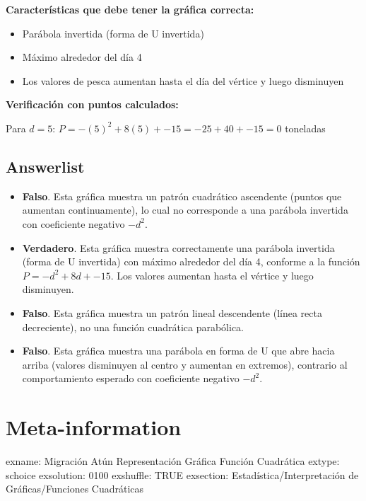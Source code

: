 \documentclass[
]{article}
\providecommand{\tightlist}{%
  \setlength{\itemsep}{0pt}\setlength{\parskip}{0pt}}
\begin{document}
\textbf{Características que debe tener la gráfica correcta:}

\begin{itemize}
\tightlist
\item
  Parábola invertida (forma de U invertida)
\item
  Máximo alrededor del día 4
\item
  Los valores de pesca aumentan hasta el día del vértice y luego
  disminuyen
\end{itemize}

\textbf{Verificación con puntos calculados:}

Para \(d = 5\): \(P = -(5)^2 + 8(5) + -15 = -25 + 40 + -15 = 0\)
toneladas

\subsection{Answerlist}\label{answerlist-1}

\begin{itemize}
\tightlist
\item
  \textbf{Falso}. Esta gráfica muestra un patrón cuadrático ascendente
  (puntos que aumentan continuamente), lo cual no corresponde a una
  parábola invertida con coeficiente negativo \(-d^2\).
\item
  \textbf{Verdadero}. Esta gráfica muestra correctamente una parábola
  invertida (forma de U invertida) con máximo alrededor del día 4,
  conforme a la función \(P = -d^2 + 8d + -15\). Los valores aumentan
  hasta el vértice y luego disminuyen.
\item
  \textbf{Falso}. Esta gráfica muestra un patrón lineal descendente
  (línea recta decreciente), no una función cuadrática parabólica.
\item
  \textbf{Falso}. Esta gráfica muestra una parábola en forma de U que
  abre hacia arriba (valores disminuyen al centro y aumentan en
  extremos), contrario al comportamiento esperado con coeficiente
  negativo \(-d^2\).
\end{itemize}

\section{Meta-information}\label{meta-information}

exname: Migración Atún Representación Gráfica Función Cuadrática extype:
schoice exsolution: 0100 exshuffle: TRUE exsection:
Estadística/Interpretación de Gráficas/Funciones Cuadráticas
\end{document}
